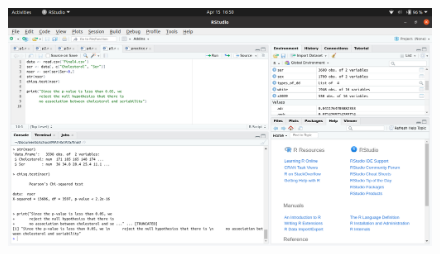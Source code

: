 \documentclass[12pt]{article}
\begin{document}
\begin{enumerate}
\begin{figure}[!h]
		\centering
		\includegraphics[width=\linewidth]{p5.png}
	\end{figure}
\end{enumerate}
\end{document}
